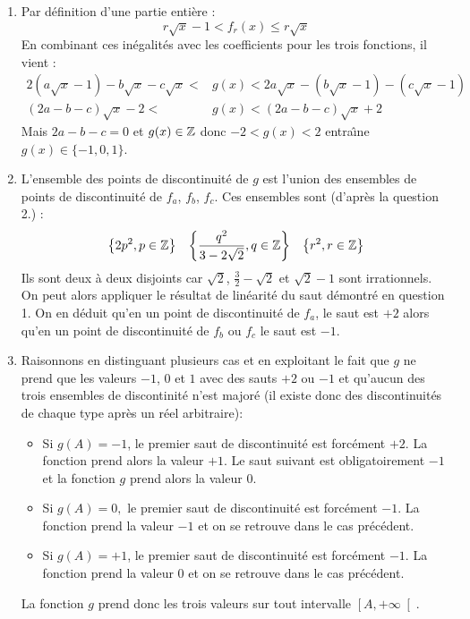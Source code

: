 \begin{enumerate}
\item  Par d\'{e}finition d'une partie enti\`{e}re : 
\begin{displaymath}
r\sqrt{x}-1<f_{r}(x)\leq r\sqrt{x} 
\end{displaymath}
En combinant ces in\'{e}galit\'{e}s avec les coefficients pour les trois fonctions, il vient : 
\begin{align*}
2(a\sqrt{x}-1)-b\sqrt{x}-c\sqrt{x} < &g(x)<2a\sqrt{x}-(b\sqrt{x}-1)-(c\sqrt{x}-1) \\
(2a-b-c)\sqrt{x}-2 < &g(x)<(2a-b-c)\sqrt{x}+2
\end{align*}
Mais $2a-b-c=0$ et $g(x) \in \mathbb{Z}$ donc $-2<g(x)<2$ entra\^{\i }ne $g(x)\in \{-1,0,1\}$.

\item L'ensemble des points de discontinuité de $g$ est l'union des ensembles de points de discontinuité de $f_a$, $f_b$, $f_c$. Ces ensembles sont (d'après la question 2.) :
\begin{align*}
 \left\lbrace 2p^2,p\in \mathbb{Z}\right\rbrace & & 
\left\lbrace \frac{q^2}{3-2\sqrt{2}},q\in \mathbb{Z}\right\rbrace & &
\left\lbrace r^2,r\in \mathbb{Z}\right\rbrace   
\end{align*}
Ils sont deux à deux disjoints car $\sqrt{2}$, $\frac{3}{2}-\sqrt{2}$ et $\sqrt{2}-1$ sont irrationnels. On peut alors appliquer le résultat de linéarité du saut démontré en question 1. On en déduit qu'en un point de discontinuit\'{e} de $f_{a}$, le saut est $+2$ alors qu'en un point de discontinuit\'{e} de $f_{b}$ ou $f_{c}$ le saut est $-1$.

\item  Raisonnons en distinguant plusieurs cas et en exploitant le fait que $g$ ne prend que les valeurs $-1$, $0$ et $1$ avec des sauts $+2$ ou $-1$ et qu'aucun des trois ensembles de discontinité n'est majoré (il existe donc des discontinuités de chaque type après un réel arbitraire):
\begin{itemize}
\item  Si $g(A)=-1$, le premier saut de discontinuit\'{e} est forc\'{e}ment $+2$. La fonction prend alors la valeur $+1$. Le saut suivant est obligatoirement $-1$ et la fonction $g$ prend alors la valeur $0$.

\item  Si $g(A)=0,$ le premier saut de discontinuit\'{e} est forc\'{e}ment $-1$. La fonction prend la valeur $-1$ et on se retrouve dans le cas pr\'{e}c\'{e}dent.

\item  Si $g(A)=+1$, le premier saut de discontinuit\'{e} est forc\'{e}ment $-1$. La fonction prend la valeur $0$ et on se retrouve dans le cas pr\'{e}c\'{e}dent.
\end{itemize}
La fonction $g$ prend donc les trois valeurs sur tout intervalle $\left[A,+\infty \right[$.
\end{enumerate}